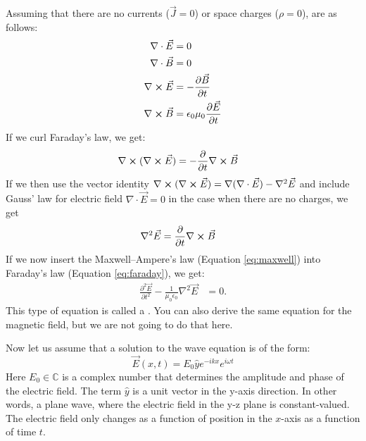 Assuming that there are no currents ($\vec{J}=0$) or space charges ($\rho=0$),
 are as follows:
\begin{align}
  \nabla \cdot \vec{E}  & = 0                                                                       \\
  \nabla \cdot \vec{B}  & = 0                                                                       \\
  \nabla \cross \vec{E} & = -\frac{\partial \vec{B}}{\partial t} \label{eq:faraday}                 \\
  \nabla \cross \vec{B} & = \epsilon_0 \mu_0 \frac{\partial \vec{E}}{\partial t} \label{eq:maxwell}
\end{align}
If we curl Faraday's law, we get:
\begin{align}
  \nabla \cross (\nabla \cross \vec{E}) & = -\frac{\partial }{\partial t}\nabla \cross \vec{B}
\end{align}
If we then use the vector identity
$\nabla \cross (\nabla \cross \vec{E}) = \nabla(\nabla \cdot \vec{E}) - \nabla^2 \vec{E}$
and include Gauss' law for electric field $\nabla \cdot \vec{E} = 0$
in the case when there are no charges, we get
\begin{align}
  \nabla^2 \vec{E} & = \frac{\partial }{\partial t}\nabla \cross \vec{B}
\end{align}
If we now insert the Maxwell–Ampere's law (Equation \ref{eq:maxwell}) into Faraday's
law (Equation \ref{eq:faraday}), we get:
\begin{align}
  \frac{\partial^2 \vec{E}}{\partial t^2} - \frac{1}{\mu_0 \epsilon_0} \nabla^2 \vec{E} & = 0.
\end{align}
This type of equation is called a . You can also derive
the same equation for the magnetic field, but we are not going to do that here.

Now let us assume that a solution to the wave equation is of the form:
\begin{equation}
  \vec{E}(x,t)= E_0 \hat{y} e^{-i k x}e^{i\omega t}
  \label{efieldplanewave}
\end{equation}
Here $E_0 \in \mathbb{C}$ is a complex number that determines the amplitude and phase of the
electric field. The term $\hat{y}$ is a unit vector in the y-axis direction.
In other words, a plane wave, where the electric field in the y-z plane is constant-valued.
The electric field only changes as a function of position in the $x$-axis as a function of time $t$.

